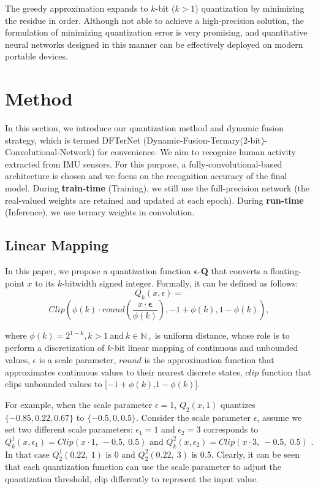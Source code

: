 \documentclass[twoside,twocolumn]{article}
\begin{document}
The greedy approximation expands to $k$-bit ($k>1$) quantization by minimizing the residue in order. Although not able to achieve a high-precision solution, the formulation of minimizing quantization error is very promising, and quantitative neural networks designed in this manner can be effectively deployed on modern portable devices.

\section{Method}\label{sec:Method}
In this section, we introduce our quantization method and dynamic fusion strategy, which is termed DFTerNet (Dynamic-Fusion-Ternary(2-bit)-Convolutional-Network) for convenience. We aim to recognize human activity extracted from IMU sensors. For this purpose, a fully-convolutional-based architecture is chosen and we focus on the recognition accuracy of the final model. During \textbf{train-time} (Training), we still use the full-precision network (the real-valued weights are retained and updated at each epoch). During \textbf{run-time} (Inference), we use ternary weights in convolution.

\subsection{Linear Mapping}
In this paper, we propose a quantization function $\boldsymbol{\epsilon}$-$\boldsymbol{Q}$ that converts a floating-point $x$ to its $k$-bitwidth signed integer. Formally, it can be defined as follows:
\begin{equation}\label{eq:quantization_function}
Q_k\left( x,\epsilon \right) =
\end{equation}
$$
Clip\left(\phi(k)\cdot round\left( \frac{x\cdot \boldsymbol{\epsilon }}{\phi \left( k \right)} \right) ,-1+\phi \left( k \right) ,1-\phi \left( k \right) \right),
$$

\noindent where $\phi \left( k \right) =2^{1-k},k>1\ \text{and}\ k\in \mathbb{N}_+$ is uniform distance, whose role is to perform a discretization of $k$-bit linear mapping of continuous and unbounded values, $\epsilon$ is a scale parameter, $round$ is the approximation function that approximates continuous values to their nearest discrete states, $clip$ function that clips unbounded values to [$-1+\phi(k)$,$1-\phi(k)$].

For example, when the scale parameter $\epsilon=1$, $Q_2(x,1)$ quantizes $\{-0.85,0.22,0.67\}$ to $\{-0.5,0,0.5\}$. Consider the scale parameter $\epsilon$, assume we set two different scale parameters: $\epsilon_1=1$ and $\epsilon_2=3$ corresponds to $Q_{k}^{1}\left( x,\epsilon _1 \right) =Clip\left( x\cdot 1,\ -0.5,\ 0.5\right)$ and $Q_{k}^{2}\left( x,\epsilon _2 \right) =Clip\left( x\cdot 3,\ -0.5,\ 0.5\right)$  . In that case $Q_{2}^{1}\left( 0.22,\ 1\right)$ is 0 and $Q_{2}^{2}\left(0.22,\ 3\right)$ is 0.5. Clearly, it can be seen that each quantization function can use the scale parameter to adjust the quantization threshold, clip differently to represent the input value.
\end{document}
